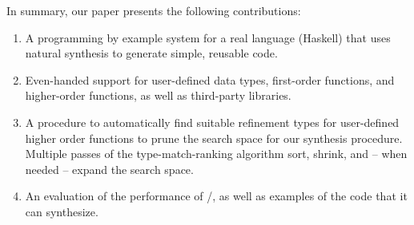 In summary, our paper presents the following contributions:

\begin{enumerate}[topsep=0pt]
\item A programming by example system for a real language (Haskell) that uses natural synthesis to generate simple, reusable code.
\item Even-handed support for user-defined data types, first-order functions, and higher-order functions, as well as third-party libraries.
\item A procedure to automatically find suitable refinement types for user-defined higher order functions to prune the search space for our synthesis procedure. Multiple passes of the type-match-ranking algorithm sort, shrink, and -- when needed -- expand the search space.
\item An evaluation of the performance of \ourTool/, as well as  examples of the code that it can synthesize.
\end{enumerate}
